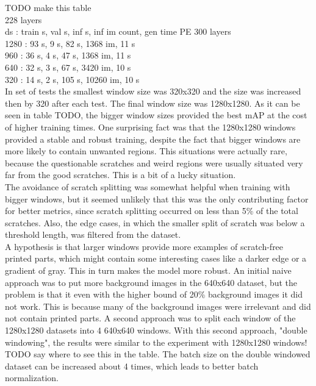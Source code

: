 TODO make this table \\
228 layers \\
ds : train s, val s, inf s, inf im count, gen time PE 300 layers \\
1280 : 93 s, 9 s, 82 s, 1368 im, 11 s \\
960 : 36 s, 4 s, 47 s, 1368 im, 11 s \\
640 : 32 s, 3 s, 67 s, 3420 im, 10 s \\
320 : 14 s, 2 s, 105 s, 10260 im, 10 s \\

In set of tests the smallest window size was 320x320 and the size was increased then by 320 after each test. The final window size was 1280x1280. As it can be seen in table TODO, the bigger window sizes provided the best mAP at the cost of higher training times. One surprising fact was that the 1280x1280 windows provided a stable and robust training, despite the fact that bigger windows are more likely to contain unwanted regions. This situations were actually rare, because the questionable scratches and weird regions were usually situated very far from the good scratches. This is a bit of a lucky situation. \\
The avoidance of scratch splitting was somewhat helpful when training with bigger windows, but it seemed unlikely that this was the only contributing factor for better metrics, since scratch splitting occurred on less than 5\% of the total scratches. Also, the edge cases, in which the smaller split of scratch was below a threshold length, was filtered from the dataset.  \\
 A hypothesis is that larger windows provide more examples of scratch-free printed parts, which might contain some interesting cases like a darker edge or a gradient of gray. This in turn makes the model more robust. An initial naive approach was to put more background images in the 640x640 dataset, but the problem is that it even with the higher bound of 20\% background images it did not work. This is because many of the background images were irrelevant and did not contain printed parts. A second approach was to split each window of the 1280x1280 datasets into 4 640x640 windows. With this second approach, "double windowing", the results were similar to the experiment with 1280x1280 windows! TODO say where to see this in the table. The batch size on the double windowed dataset can be increased about 4 times, which leads to better batch normalization. \\

